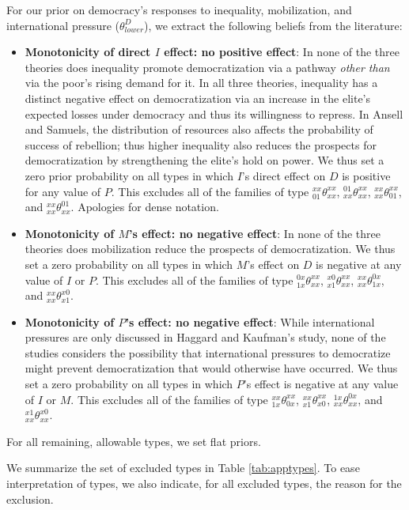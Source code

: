 \documentclass[12pt,]{book}
\begin{document}
For our prior on democracy's responses to inequality, mobilization, and international pressure (\(\theta^D_{lower}\)), we extract the following beliefs from the literature:

\begin{itemize}
\item
  \textbf{Monotonicity of direct \(I\) effect: no positive effect}: In none of the three theories does inequality promote democratization via a pathway \emph{other than} via the poor's rising demand for it. In all three theories, inequality has a distinct negative effect on democratization via an increase in the elite's expected losses under democracy and thus its willingness to repress. In Ansell and Samuels, the distribution of resources also affects the probability of success of rebellion; thus higher inequality also reduces the prospects for democratization by strengthening the elite's hold on power. We thus set a zero prior probability on all types in which \(I\)'s direct effect on \(D\) is positive for any value of \(P\). This excludes all of the families of type \(_{01}^{xx}\theta_{xx}^{xx}\), \(_{xx}^{01}\theta_{xx}^{xx}\), \(_{xx}^{xx}\theta_{01}^{xx}\), and \(_{xx}^{xx}\theta_{xx}^{01}\). Apologies for dense notation.
\item
  \textbf{Monotonicity of \(M\)'s effect: no negative effect}: In none of the three theories does mobilization reduce the prospects of democratization. We thus set a zero probability on all types in which \(M\)'s effect on \(D\) is negative at any value of \(I\) or \(P\). This excludes all of the families of type \(_{1x}^{0x}\theta_{xx}^{xx}\), \(_{x1}^{x0}\theta_{xx}^{xx}\), \(_{xx}^{xx}\theta_{1x}^{0x}\), and \(_{xx}^{xx}\theta_{x1}^{x0}\).
\item
  \textbf{Monotonicity of \(P\)'s effect: no negative effect}: While international pressures are only discussed in Haggard and Kaufman's study, none of the studies considers the possibility that international pressures to democratize might prevent democratization that would otherwise have occurred. We thus set a zero probability on all types in which \(P\)'s effect is negative at any value of \(I\) or \(M\). This excludes all of the families of type \(_{1x}^{xx}\theta_{0x}^{xx}\), \(_{x1}^{xx}\theta_{x0}^{xx}\), \(_{xx}^{1x}\theta_{xx}^{0x}\), and \(_{xx}^{x1}\theta_{xx}^{x0}\).
\end{itemize}

For all remaining, allowable types, we set flat priors.

We summarize the set of excluded types in Table \ref{tab:apptypes}. To ease interpretation of types, we also indicate, for all excluded types, the reason for the exclusion.
\end{document}
